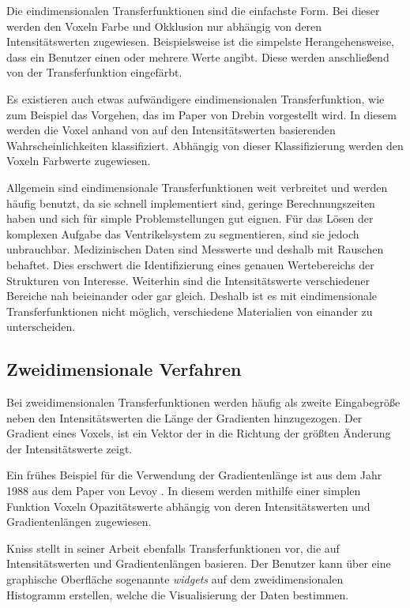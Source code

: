 Die eindimensionalen Transferfunktionen sind die einfachste Form. Bei dieser werden den Voxeln Farbe und Okklusion nur abhängig von deren Intensitätswerten zugewiesen. Beispielsweise ist die simpelste Herangehensweise, dass ein Benutzer einen oder mehrere Werte angibt. Diese werden anschließend von der Transferfunktion eingefärbt.

Es existieren auch etwas aufwändigere eindimensionalen Transferfunktion, wie zum Beispiel das Vorgehen, das im Paper von Drebin \cite{drebin1988volume} vorgestellt wird. In diesem werden die Voxel anhand von auf den Intensitätswerten basierenden Wahrscheinlichkeiten klassifiziert. Abhängig von dieser Klassifizierung werden den Voxeln Farbwerte zugewiesen.

Allgemein sind eindimensionale Transferfunktionen weit verbreitet und werden häufig benutzt, da sie schnell implementiert sind, geringe Berechnungszeiten haben und sich für simple Problemstellungen gut eignen.
\newline
Für das Lösen der komplexen Aufgabe das Ventrikelsystem zu segmentieren, sind sie jedoch unbrauchbar. Medizinischen Daten sind Messwerte und deshalb mit Rauschen behaftet. Dies erschwert die Identifizierung eines genauen Wertebereichs der Strukturen von Interesse. Weiterhin sind die Intensitätswerte verschiedener Bereiche nah beieinander oder gar gleich. Deshalb ist es mit eindimensionale Transferfunktionen nicht möglich, verschiedene Materialien von einander zu unterscheiden.



\subsection{Zweidimensionale Verfahren}

Bei zweidimensionalen Transferfunktionen werden häufig als zweite Eingabegröße neben den Intensitätswerten die Länge der Gradienten hinzugezogen. Der Gradient eines Voxels, ist ein Vektor der in die Richtung der größten Änderung der Intensitätswerte zeigt.


Ein frühes Beispiel für die Verwendung der Gradientenlänge ist aus dem Jahr 1988 aus dem Paper von Levoy \cite{levoy1988display}. In diesem werden mithilfe einer simplen Funktion Voxeln Opazitätswerte abhängig von deren Intensitätswerten und Gradientenlängen zugewiesen.


Kniss stellt in seiner Arbeit \cite{kniss2002multidimensional} ebenfalls Transferfunktionen vor, die auf Intensitätswerten und Gradientenlängen basieren. Der Benutzer kann über eine graphische Oberfläche sogenannte \textit{widgets} auf dem zweidimensionalen Histogramm erstellen, welche die Visualisierung der Daten bestimmen.


